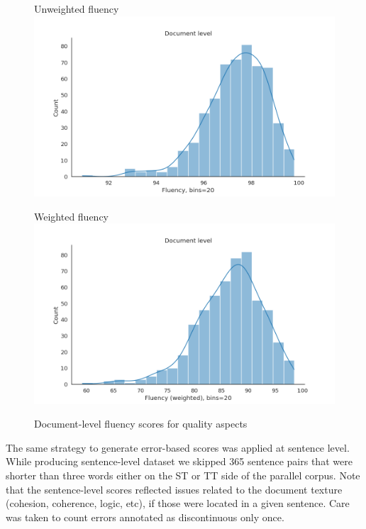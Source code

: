 \begin{figure}[H]
	\begin{minipage}[c]{0.45\linewidth}
		\centering
		Unweighted fluency
		\includegraphics[width=\textwidth]{figures/err/doc-fluency-noweights}
	\end{minipage}
	\begin{minipage}[c]{0.45\linewidth}
		\centering
		Weighted fluency
		\includegraphics[width=\textwidth]{figures/err/doc-fluency-major2critical5weighted}
	\end{minipage}
	\caption{Document-level fluency scores for quality aspects}
	\label{fig:docs_fluency}
\end{figure}

\label{pg:shorts_filtered_out}
The same strategy to generate error-based scores was applied at sentence level. While producing sentence-level dataset we skipped 365 sentence pairs that were shorter than three words either on the ST or TT side of the parallel corpus. Note that the sentence-level scores reflected issues related to the document texture (cohesion, coherence, logic, etc), if those were located in a given sentence. 
Care was taken to count errors annotated as discontinuous only once.

